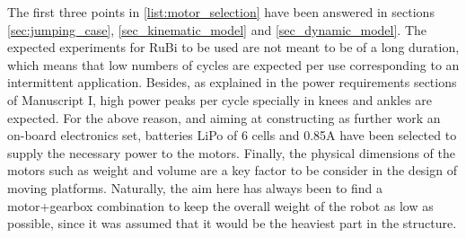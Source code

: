 The first three points in \ref{list:motor_selection} have been answered in sections \ref{sec:jumping_case}, \ref{sec_kinematic_model} and \ref{sec_dynamic_model}.
The expected experiments for RuBi to be used are not meant to be of a long duration, which means that low numbers of cycles are expected per use corresponding to an intermittent application.
Besides, as explained in the power requirements sections of \cite{grimmer} Manuscript I, high power peaks per cycle specially in knees and ankles are expected.
For the above reason, and aiming at constructing as further work an on-board electronics set, batteries LiPo of 6 cells and 0.85A have been selected to supply the necessary power to the motors.
Finally, the physical dimensions of the motors such as weight and volume are a key factor to be consider in the design of moving platforms. 
Naturally, the aim here has always been to find a motor+gearbox combination to keep the overall weight of the robot as low as possible, since it was assumed that it would be the heaviest part in the structure.
